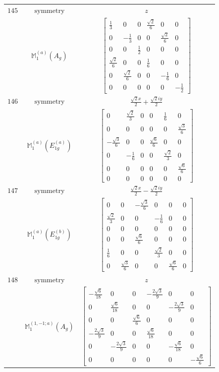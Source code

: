 \documentclass[fleqn,8pt,landscape]{jsarticle}
\begin{document}
\begin{longtable}{ccc}
$ 145 $ & $ \text{symmetry} $ & $ z $ \\
$  $ & $ \mathbb{M}_{1}^{(a)}(A_{g}) $ & $ \begin{bmatrix} \frac{1}{3} & 0 & 0 & \frac{\sqrt{2}}{6} & 0 & 0 \\ 0 & - \frac{1}{3} & 0 & 0 & \frac{\sqrt{2}}{6} & 0 \\ 0 & 0 & \frac{1}{2} & 0 & 0 & 0 \\ \frac{\sqrt{2}}{6} & 0 & 0 & \frac{1}{6} & 0 & 0 \\ 0 & \frac{\sqrt{2}}{6} & 0 & 0 & - \frac{1}{6} & 0 \\ 0 & 0 & 0 & 0 & 0 & - \frac{1}{2} \end{bmatrix} $ \\ \hline
$ 146 $ & $ \text{symmetry} $ & $ \frac{\sqrt{2} x}{2} + \frac{\sqrt{2} i y}{2} $ \\
$  $ & $ \mathbb{M}_{1}^{(a)}(E_{1g}^{(a)}) $ & $ \begin{bmatrix} 0 & \frac{\sqrt{2}}{3} & 0 & 0 & \frac{1}{6} & 0 \\ 0 & 0 & 0 & 0 & 0 & \frac{\sqrt{3}}{6} \\ - \frac{\sqrt{3}}{6} & 0 & 0 & \frac{\sqrt{6}}{6} & 0 & 0 \\ 0 & - \frac{1}{6} & 0 & 0 & \frac{\sqrt{2}}{3} & 0 \\ 0 & 0 & 0 & 0 & 0 & \frac{\sqrt{6}}{6} \\ 0 & 0 & 0 & 0 & 0 & 0 \end{bmatrix} $ \\ \hline
$ 147 $ & $ \text{symmetry} $ & $ \frac{\sqrt{2} x}{2} - \frac{\sqrt{2} i y}{2} $ \\
$  $ & $ \mathbb{M}_{1}^{(a)}(E_{1g}^{(b)}) $ & $ \begin{bmatrix} 0 & 0 & - \frac{\sqrt{3}}{6} & 0 & 0 & 0 \\ \frac{\sqrt{2}}{3} & 0 & 0 & - \frac{1}{6} & 0 & 0 \\ 0 & 0 & 0 & 0 & 0 & 0 \\ 0 & 0 & \frac{\sqrt{6}}{6} & 0 & 0 & 0 \\ \frac{1}{6} & 0 & 0 & \frac{\sqrt{2}}{3} & 0 & 0 \\ 0 & \frac{\sqrt{3}}{6} & 0 & 0 & \frac{\sqrt{6}}{6} & 0 \end{bmatrix} $ \\ \hline
$ 148 $ & $ \text{symmetry} $ & $ z $ \\
$  $ & $ \mathbb{M}_{1}^{(1,-1;a)}(A_{g}) $ & $ \begin{bmatrix} - \frac{\sqrt{6}}{18} & 0 & 0 & - \frac{2 \sqrt{3}}{9} & 0 & 0 \\ 0 & \frac{\sqrt{6}}{18} & 0 & 0 & - \frac{2 \sqrt{3}}{9} & 0 \\ 0 & 0 & \frac{\sqrt{6}}{6} & 0 & 0 & 0 \\ - \frac{2 \sqrt{3}}{9} & 0 & 0 & \frac{\sqrt{6}}{18} & 0 & 0 \\ 0 & - \frac{2 \sqrt{3}}{9} & 0 & 0 & - \frac{\sqrt{6}}{18} & 0 \\ 0 & 0 & 0 & 0 & 0 & - \frac{\sqrt{6}}{6} \end{bmatrix} $ \\ \hline

\end{longtable}
\end{document}
